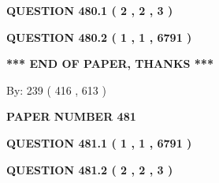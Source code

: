 \documentclass[12pt]{article}
\begin{document}
   
   
   
 \vspace{0.2in}
 
 
 
 
   
   
  
\vspace{0.2in}
  
{\textbf{\Large{QUESTION
480.1 
 ( 2 , 2 , 3 )
}}}
  
  
  
\vspace{0.2in}
  
{\textbf{\Large{QUESTION
480.2 
 ( 1 , 1 , 6791 )
}}}
  
  
   
   
 \vspace{0.2in}
 
   
   
   
   
\vspace{1.0in} 
{\textbf{\large{ *** END OF PAPER, THANKS *** }}} 
   
   
\hspace{1.0in} By: 
 239 ( 416 ,  613 )
   
   
   
   
\newpage 
\setcounter{page}{ 
   481001 } 
   
   
   
   
 {\textbf{ \Large{ PAPER NUMBER  481  }}}
   
   
\vspace{0.2in}
   
   
   
   
   
   
 \vspace{0.2in}
 
 
 
 
   
   
  
\vspace{0.2in}
  
{\textbf{\Large{QUESTION
481.1 
 ( 1 , 1 , 6791 )
}}}
  
  
  
\vspace{0.2in}
  
{\textbf{\Large{QUESTION
481.2 
 ( 2 , 2 , 3 )
}}}
  
  
   
   
 \vspace{0.2in}
 
\end{document}
